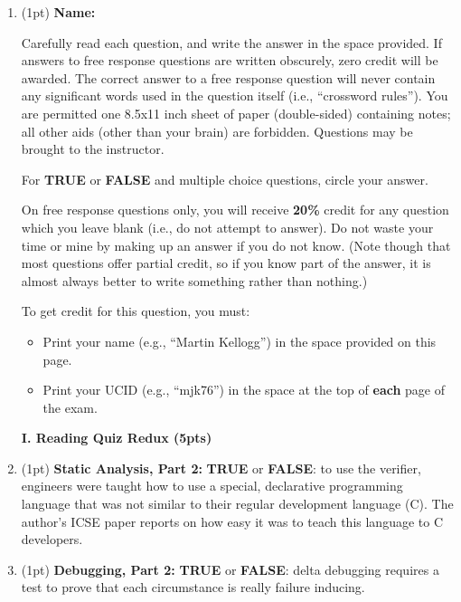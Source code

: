 \documentclass{report}
\newif\ifkey
\newcommand{\correct}[1]{\ifkey\color{red}\textbf{#1}\color{black}\else\textbf{#1}\fi\xspace}
\newcommand*{\pts}[1]{\addtocounter{points}{#1}(#1pt)}
\begin{document}
\begin{spacing}{1.4}

\begin{enumerate}[leftmargin=*]
\item \pts{1} \textbf{Name:} \hrulefill

Carefully read each question, and write the answer in the space
provided.  If answers to free response questions are written obscurely,
zero credit will be awarded. The correct answer to a free response question
will never contain any significant words used in the question itself (i.e., ``crossword rules'').
You are permitted one 8.5x11 inch sheet of paper (double-sided)
containing notes; all other aids (other than your brain) are forbidden.
Questions may be brought to the instructor.

For \textbf{TRUE} or \textbf{FALSE} and multiple choice questions,
circle your answer.

On free response questions only, you will receive \textbf{20\%} credit
for any question which you leave blank (i.e., do not attempt to
answer). Do not waste your time or mine by making up an answer if you
do not know. (Note though that most questions offer partial credit, so
if you know part of the answer, it is almost always better to write something
rather than nothing.)

To get credit for this question, you must:
\begin{itemize}
\item Print your name (e.g., ``Martin Kellogg'') in the space provided on this page.
\item Print your UCID (e.g., ``mjk76'') in the space at the top of \textbf{each} page of the exam.
\end{itemize}
  
\newpage

\textbf{I. Reading Quiz Redux (5pts)}

\item \pts{1}
  \textbf{Static Analysis, Part 2:} \textbf{TRUE} or
  \correct{FALSE}: to use the verifier, engineers were taught how to
  use a special, declarative programming language that was not similar
  to their regular development language (C). The author's ICSE paper
  reports on how easy it was to teach this language to C developers.

\item \pts{1}
  \textbf{Debugging, Part 2:} \correct{TRUE} or \textbf{FALSE}:
  delta debugging requires a test to prove that each circumstance is really failure inducing.


\end{enumerate}
\end{spacing}
\end{document}
